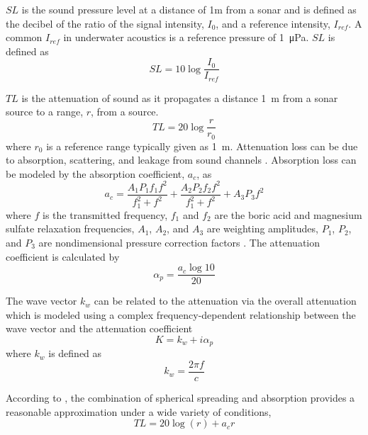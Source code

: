 \documentclass[11pt]{article}
\begin{document}
$SL$ is the sound pressure level at a distance of 1m from a sonar and is defined as the decibel of the ratio of the signal intensity, $I_0$, and a reference intensity, $I_{ref}$. A common $I_{ref}$ in underwater acoustics is a reference pressure of \SI{1}{\micro\pascal}. $SL$ is defined as
\begin{equation}
SL=10\log\frac{I_0}{I_{ref}}
\end{equation}

$TL$ is the attenuation of sound as it propagates a distance \SI{1}{\meter} from a sonar source to a range, $r$, from a source.
\begin{equation}
    TL=20\log\frac{r}{r_0}
\end{equation}
where $r_0$ is a reference range typically given as \SI{1}{\meter}. Attenuation loss can be due to absorption, scattering, and leakage from sound channels \cite{urick13principles}. Absorption loss can be modeled by the absorption coefficient, $a_c$, as
\begin{equation}
    a_c=\frac{A_1 P_1 f_1 f^2}{f_1^2 + f^2} + \frac{A_2 P_2 f_2 f^2}{f_1^2 + f^2} + A_3 P_3 f^2
\end{equation}
where $f$ is the transmitted frequency, $f_1$ and $f_2$ are the boric acid and magnesium sulfate relaxation frequencies, $A_1$, $A_2$, and $A_3$ are weighting amplitudes, $P_1$, $P_2$, and $P_3$ are nondimensional pressure correction factors \cite{francois82sound}. The attenuation coefficient is calculated by 
\begin{equation}
    \alpha_p = \frac{a_c \log 10}{20}
\end{equation}

The wave vector $k_w$ can be related to the attenuation via the overall attenuation which is modeled using a complex frequency-dependent relationship between the wave vector and the attenuation coefficient
\begin{equation}
    \label{eq:K}
    K = k_w + i\alpha_p
\end{equation}
where $k_w$ is defined as 
\begin{equation}
    k_w = \frac{2 \pi f}{c}
\end{equation}

According to \cite{urick13principles}, the combination of spherical spreading and absorption provides a reasonable approximation under a wide variety of conditions,
\begin{equation}
    TL=20 \log(r) + a_c r
\end{equation}
\end{document}
